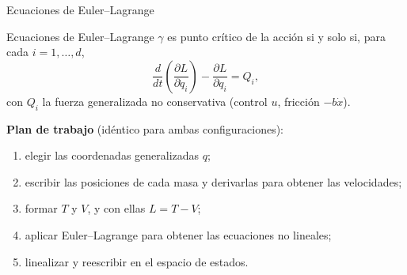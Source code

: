 \documentclass[aspectratio=169,11pt]{beamer}
\begin{document}
\begin{frame}{Ecuaciones de Euler--Lagrange}
  \begin{cajateo}{Ecuaciones de Euler--Lagrange}
    $\gamma$ es punto cr\'itico de la acci\'on si y solo si, para cada
    $i=1,\dots,d$,
    \[
      \frac{d}{dt}\!\left(\frac{\partial L}{\partial \dot q_i}\right)
      -\frac{\partial L}{\partial q_i}=Q_i ,
    \]
    con $Q_i$ la fuerza generalizada no conservativa (control $u$, fricci\'on $-b\dot x$).
  \end{cajateo}
  \vspace{0.3em}
  \textbf{Plan de trabajo} (id\'entico para ambas configuraciones):
  \begin{enumerate}
    \small
    \item[$i$.] elegir las coordenadas generalizadas $q$;
    \item[$ii$.] escribir las posiciones de cada masa y derivarlas para obtener
                 las velocidades;
    \item[$iii$.] formar $T$ y $V$, y con ellas $L=T-V$;
    \item[$iv$.] aplicar Euler--Lagrange para obtener las ecuaciones no lineales;
    \item[$v$.] linealizar y reescribir en el espacio de estados.
  \end{enumerate}
\end{frame}
\end{document}
